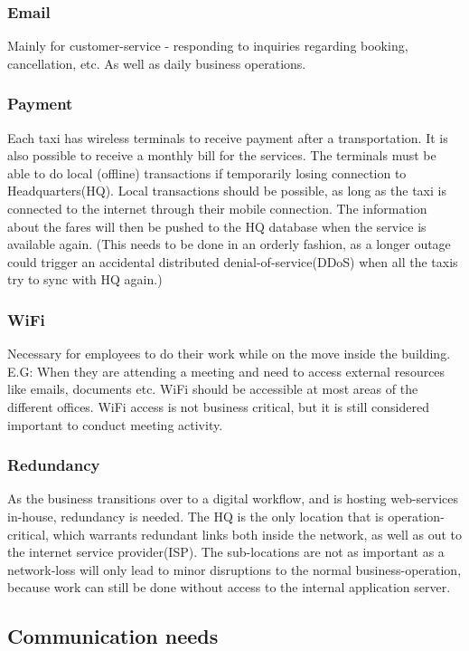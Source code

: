 \subsubsection{Email}
Mainly for customer-service - responding to inquiries regarding booking, cancellation, etc.
As well as daily business operations.

\subsubsection{Payment}
Each taxi has wireless terminals to receive payment after a transportation. It is also possible to receive a monthly bill for the services. 
The terminals must be able to do local (offline) transactions if temporarily losing connection to Headquarters(HQ).
Local transactions should be possible, as long as the taxi is connected to the internet through their mobile connection. 
The information about the fares will then be pushed to the HQ database when the service is available again. (This needs to be done in an orderly fashion, as a longer outage could trigger an accidental distributed denial-of-service(DDoS) when all the taxis try to sync with HQ again.)

\subsubsection{WiFi}
Necessary for employees to do their work while on the move inside the building. 
E.G: When they are attending a meeting and need to access external resources like emails, documents etc.
WiFi should be accessible at most areas of the different offices.
WiFi access is not business critical, but it is still considered important to conduct meeting activity.

\subsubsection{Redundancy}
As the business transitions over to a digital workflow, and is hosting web-services in-house, redundancy is needed.
The HQ is the only location that is operation-critical, which warrants redundant links both inside the network, as well as out to the internet service provider(ISP). 
The sub-locations are not as important as a network-loss will only lead to minor disruptions to the normal business-operation, because work can still be done without access to the internal application server.

\subsection{Communication needs}

